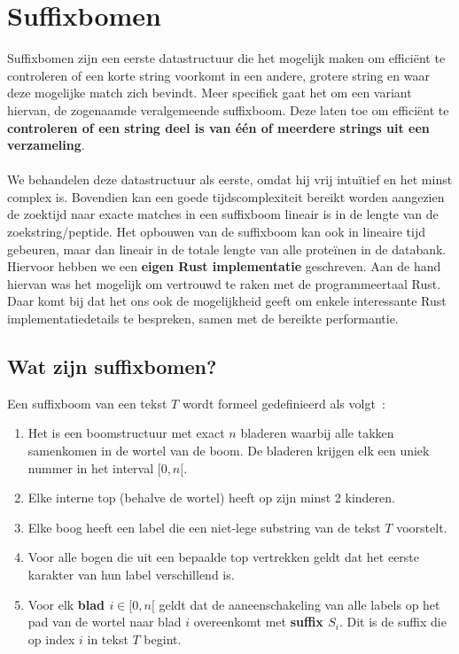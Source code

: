 \chapter{Suffixbomen}\label{ch:suffix-bomen}
Suffixbomen zijn een eerste datastructuur die het mogelijk maken om efficiënt te controleren of een korte string voorkomt in een andere, grotere string en waar deze mogelijke match zich bevindt.
Meer specifiek gaat het om een variant hiervan, de zogenaamde veralgemeende suffixboom.
Deze laten toe om efficiënt te \textbf{controleren of een string deel is van één of meerdere strings uit een verzameling}.
\\ \\
We behandelen deze datastructuur als eerste, omdat hij vrij intuïtief en het minst complex is.
Bovendien kan een goede tijdscomplexiteit bereikt worden aangezien de zoektijd naar exacte matches in een suffixboom lineair is in de lengte van de zoekstring/peptide.
Het opbouwen van de suffixboom kan ook in lineaire tijd gebeuren, maar dan lineair in de totale lengte van alle proteïnen in de databank.
Hiervoor hebben we een \textbf{eigen Rust implementatie} geschreven.
Aan de hand hiervan was het mogelijk om vertrouwd te raken met de programmeertaal Rust.
Daar komt bij dat het ons ook de mogelijkheid geeft om enkele interessante Rust implementatiedetails te bespreken, samen met de bereikte performantie.

\section{Wat zijn suffixbomen?}\label{sec:wat-zijn-suffix-bomen?}
Een suffixboom van een tekst $T$ wordt formeel gedefinieerd als volgt~\cite{CCB_course}:
\begin{enumerate}
    \item Het is een boomstructuur met exact $n$ bladeren waarbij alle takken samenkomen in de wortel van de boom.
    De bladeren krijgen elk een uniek nummer in het interval $[0, n[$.
    \item Elke interne top (behalve de wortel) heeft op zijn minst 2 kinderen.
    \item Elke boog heeft een label die een niet-lege substring van de tekst $T$ voorstelt.
    \item Voor alle bogen die uit een bepaalde top vertrekken geldt dat het eerste karakter van hun label verschillend is.
    \item Voor elk \textbf{blad $i \in [0, n[$} geldt dat de aaneenschakeling van alle labels op het pad van de wortel naar blad $i$ overeenkomt met \textbf{suffix $S_i$}.
    Dit is de suffix die op index $i$ in tekst $T$ begint.
\end{enumerate}

